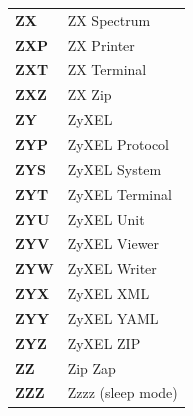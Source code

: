 \begin{longtable}{p{3cm}p{11cm}}
\textbf{ZX} & ZX Spectrum \\
\textbf{ZXP} & ZX Printer \\
\textbf{ZXT} & ZX Terminal \\
\textbf{ZXZ} & ZX Zip \\
\textbf{ZY} & ZyXEL \\
\textbf{ZYP} & ZyXEL Protocol \\
\textbf{ZYS} & ZyXEL System \\
\textbf{ZYT} & ZyXEL Terminal \\
\textbf{ZYU} & ZyXEL Unit \\
\textbf{ZYV} & ZyXEL Viewer \\
\textbf{ZYW} & ZyXEL Writer \\
\textbf{ZYX} & ZyXEL XML \\
\textbf{ZYY} & ZyXEL YAML \\
\textbf{ZYZ} & ZyXEL ZIP \\
\textbf{ZZ} & Zip Zap \\
\textbf{ZZZ} & Zzzz (sleep mode) \\
\end{longtable}
